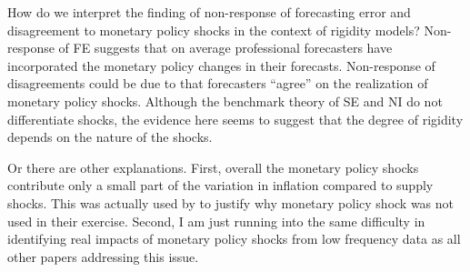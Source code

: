 \documentclass[12pt]{article}
\begin{document}
	How do we interpret the finding of non-response of forecasting error and disagreement to monetary policy shocks in the context of rigidity models? Non-response of FE suggests that on average professional forecasters have incorporated the monetary policy changes in their forecasts. Non-response of disagreements could be due to that forecasters ``agree'' on the realization of monetary policy shocks. Although the benchmark theory of SE and NI do not differentiate shocks, the evidence here seems to suggest that the degree of rigidity depends on the nature of the shocks. 
	
	Or there are other explanations.  First, overall the monetary policy shocks contribute only a small part of the variation in inflation compared to supply shocks. This was actually used by \cite{coibion2012can} to justify why monetary policy shock was not used in their exercise.  Second,  I am just running into the same difficulty in identifying real impacts of monetary policy shocks from low frequency data as all other papers addressing this issue. 
	
\end{document}
